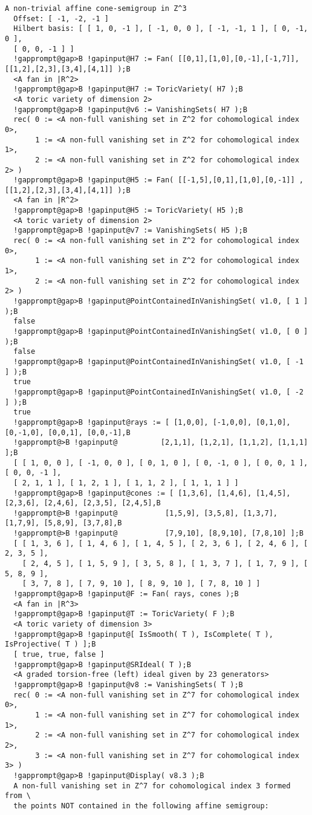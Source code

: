 \documentclass[a4paper,11pt]{report}
\begin{document}
{{\begin{Verbatim}[commandchars=!@B,fontsize=\small,frame=single,label=Example]
  A non-trivial affine cone-semigroup in Z^3
  Offset: [ -1, -2, -1 ]
  Hilbert basis: [ [ 1, 0, -1 ], [ -1, 0, 0 ], [ -1, -1, 1 ], [ 0, -1, 0 ],
  [ 0, 0, -1 ] ]
  !gapprompt@gap>B !gapinput@H7 := Fan( [[0,1],[1,0],[0,-1],[-1,7]], [[1,2],[2,3],[3,4],[4,1]] );B
  <A fan in |R^2>
  !gapprompt@gap>B !gapinput@H7 := ToricVariety( H7 );B
  <A toric variety of dimension 2>
  !gapprompt@gap>B !gapinput@v6 := VanishingSets( H7 );B
  rec( 0 := <A non-full vanishing set in Z^2 for cohomological index 0>,
       1 := <A non-full vanishing set in Z^2 for cohomological index 1>,
       2 := <A non-full vanishing set in Z^2 for cohomological index 2> )
  !gapprompt@gap>B !gapinput@H5 := Fan( [[-1,5],[0,1],[1,0],[0,-1]] ,[[1,2],[2,3],[3,4],[4,1]] );B
  <A fan in |R^2>
  !gapprompt@gap>B !gapinput@H5 := ToricVariety( H5 );B
  <A toric variety of dimension 2>
  !gapprompt@gap>B !gapinput@v7 := VanishingSets( H5 );B
  rec( 0 := <A non-full vanishing set in Z^2 for cohomological index 0>,
       1 := <A non-full vanishing set in Z^2 for cohomological index 1>,
       2 := <A non-full vanishing set in Z^2 for cohomological index 2> )
  !gapprompt@gap>B !gapinput@PointContainedInVanishingSet( v1.0, [ 1 ] );B
  false
  !gapprompt@gap>B !gapinput@PointContainedInVanishingSet( v1.0, [ 0 ] );B
  false
  !gapprompt@gap>B !gapinput@PointContainedInVanishingSet( v1.0, [ -1 ] );B
  true
  !gapprompt@gap>B !gapinput@PointContainedInVanishingSet( v1.0, [ -2 ] );B
  true
  !gapprompt@gap>B !gapinput@rays := [ [1,0,0], [-1,0,0], [0,1,0], [0,-1,0], [0,0,1], [0,0,-1],B
  !gapprompt@>B !gapinput@          [2,1,1], [1,2,1], [1,1,2], [1,1,1] ];B
  [ [ 1, 0, 0 ], [ -1, 0, 0 ], [ 0, 1, 0 ], [ 0, -1, 0 ], [ 0, 0, 1 ], [ 0, 0, -1 ], 
  [ 2, 1, 1 ], [ 1, 2, 1 ], [ 1, 1, 2 ], [ 1, 1, 1 ] ]
  !gapprompt@gap>B !gapinput@cones := [ [1,3,6], [1,4,6], [1,4,5], [2,3,6], [2,4,6], [2,3,5], [2,4,5],B
  !gapprompt@>B !gapinput@           [1,5,9], [3,5,8], [1,3,7], [1,7,9], [5,8,9], [3,7,8],B
  !gapprompt@>B !gapinput@           [7,9,10], [8,9,10], [7,8,10] ];B
  [ [ 1, 3, 6 ], [ 1, 4, 6 ], [ 1, 4, 5 ], [ 2, 3, 6 ], [ 2, 4, 6 ], [ 2, 3, 5 ],
    [ 2, 4, 5 ], [ 1, 5, 9 ], [ 3, 5, 8 ], [ 1, 3, 7 ], [ 1, 7, 9 ], [ 5, 8, 9 ], 
    [ 3, 7, 8 ], [ 7, 9, 10 ], [ 8, 9, 10 ], [ 7, 8, 10 ] ]
  !gapprompt@gap>B !gapinput@F := Fan( rays, cones );B
  <A fan in |R^3>
  !gapprompt@gap>B !gapinput@T := ToricVariety( F );B
  <A toric variety of dimension 3>
  !gapprompt@gap>B !gapinput@[ IsSmooth( T ), IsComplete( T ), IsProjective( T ) ];B
  [ true, true, false ]
  !gapprompt@gap>B !gapinput@SRIdeal( T );B
  <A graded torsion-free (left) ideal given by 23 generators>
  !gapprompt@gap>B !gapinput@v8 := VanishingSets( T );B
  rec( 0 := <A non-full vanishing set in Z^7 for cohomological index 0>,
       1 := <A non-full vanishing set in Z^7 for cohomological index 1>,
       2 := <A non-full vanishing set in Z^7 for cohomological index 2>,
       3 := <A non-full vanishing set in Z^7 for cohomological index 3> )
  !gapprompt@gap>B !gapinput@Display( v8.3 );B
  A non-full vanishing set in Z^7 for cohomological index 3 formed from \
  the points NOT contained in the following affine semigroup: 
  

\end{Verbatim}}}
\end{document}
